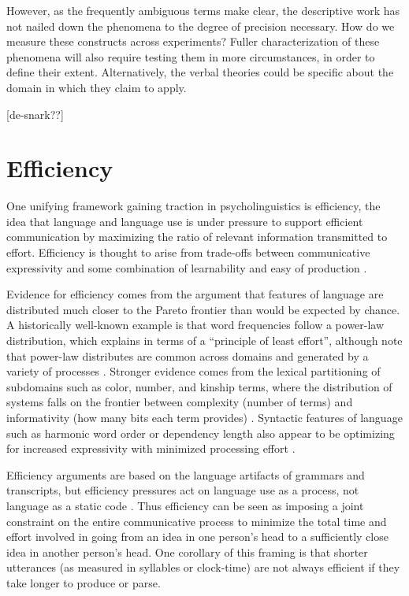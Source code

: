 \documentclass[]{article}
\begin{document}
However, as the frequently ambiguous terms make clear, the descriptive work has not nailed down the phenomena to the degree of precision necessary. How do we measure these constructs across experiments? Fuller characterization of these phenomena will also require testing them in more circumstances, in order to define their extent. Alternatively, the verbal theories could be specific about the domain in which they claim to apply.  

[de-snark??]




\section{Efficiency}
One unifying framework gaining traction in psycholinguistics is efficiency, the idea that language and language use is under pressure to support efficient communication by maximizing the ratio of relevant information transmitted to effort. Efficiency is thought to arise from trade-offs between communicative expressivity and some combination of learnability and easy of production \cite{piantadosi2012, kirby2015}. 

Evidence for efficiency comes from the argument that features of language are distributed much closer to the Pareto frontier than would be expected by chance. A historically well-known example is that word frequencies follow a power-law distribution, which \cite{zipf1949} explains in terms of a ``principle of least effort'', although note that power-law distributes are common across domains and generated by a variety of processes \cite{piantadosi2014}. Stronger evidence comes from the lexical partitioning of subdomains such as color, number, and kinship terms, where the distribution of systems falls on the frontier between complexity (number of terms) and informativity (how many bits each term provides) \cite{keysar2000, gibson2019}. Syntactic features of language such as harmonic word order or dependency length also appear to be optimizing for increased expressivity with minimized processing effort \cite{gibson2019, hawkins1995}. 
	
Efficiency arguments are based on the language artifacts of grammars and transcripts, but efficiency pressures act on language use as a process, not language as a static code \cite{gibson2019}. Thus efficiency can be seen as imposing a joint constraint on the entire communicative process to minimize the total time and effort involved in going from an idea in one person's head to a sufficiently close idea in another person's head. One corollary of this framing is that shorter utterances (as measured in syllables or clock-time) are not always efficient if they take longer to produce or parse. 
\end{document}
